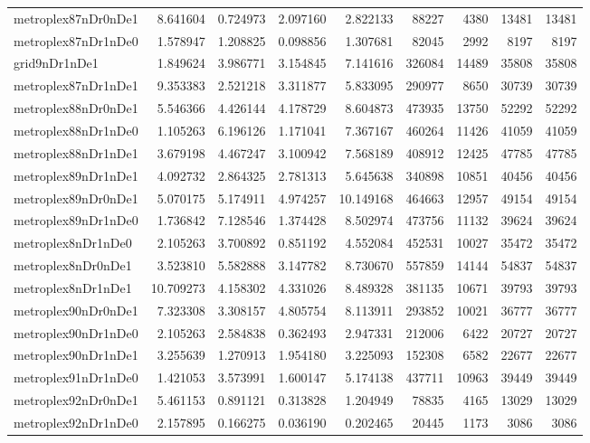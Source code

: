 \begin{longtable}{|l|r|r|r|r|r|r|r|r|}
metroplex87nDr0nDe1 & 8.641604 & 0.724973 & 2.097160 & 2.822133 & 88227 & 4380 & 13481 & 13481 \\
metroplex87nDr1nDe0 & 1.578947 & 1.208825 & 0.098856 & 1.307681 & 82045 & 2992 & 8197 & 8197 \\
grid9nDr1nDe1 & 1.849624 & 3.986771 & 3.154845 & 7.141616 & 326084 & 14489 & 35808 & 35808 \\
metroplex87nDr1nDe1 & 9.353383 & 2.521218 & 3.311877 & 5.833095 & 290977 & 8650 & 30739 & 30739 \\
metroplex88nDr0nDe1 & 5.546366 & 4.426144 & 4.178729 & 8.604873 & 473935 & 13750 & 52292 & 52292 \\
metroplex88nDr1nDe0 & 1.105263 & 6.196126 & 1.171041 & 7.367167 & 460264 & 11426 & 41059 & 41059 \\
metroplex88nDr1nDe1 & 3.679198 & 4.467247 & 3.100942 & 7.568189 & 408912 & 12425 & 47785 & 47785 \\
metroplex89nDr1nDe1 & 4.092732 & 2.864325 & 2.781313 & 5.645638 & 340898 & 10851 & 40456 & 40456 \\
metroplex89nDr0nDe1 & 5.070175 & 5.174911 & 4.974257 & 10.149168 & 464663 & 12957 & 49154 & 49154 \\
metroplex89nDr1nDe0 & 1.736842 & 7.128546 & 1.374428 & 8.502974 & 473756 & 11132 & 39624 & 39624 \\
metroplex8nDr1nDe0 & 2.105263 & 3.700892 & 0.851192 & 4.552084 & 452531 & 10027 & 35472 & 35472 \\
metroplex8nDr0nDe1 & 3.523810 & 5.582888 & 3.147782 & 8.730670 & 557859 & 14144 & 54837 & 54837 \\
metroplex8nDr1nDe1 & 10.709273 & 4.158302 & 4.331026 & 8.489328 & 381135 & 10671 & 39793 & 39793 \\
metroplex90nDr0nDe1 & 7.323308 & 3.308157 & 4.805754 & 8.113911 & 293852 & 10021 & 36777 & 36777 \\
metroplex90nDr1nDe0 & 2.105263 & 2.584838 & 0.362493 & 2.947331 & 212006 & 6422 & 20727 & 20727 \\
metroplex90nDr1nDe1 & 3.255639 & 1.270913 & 1.954180 & 3.225093 & 152308 & 6582 & 22677 & 22677 \\
metroplex91nDr1nDe0 & 1.421053 & 3.573991 & 1.600147 & 5.174138 & 437711 & 10963 & 39449 & 39449 \\
metroplex92nDr0nDe1 & 5.461153 & 0.891121 & 0.313828 & 1.204949 & 78835 & 4165 & 13029 & 13029 \\
metroplex92nDr1nDe0 & 2.157895 & 0.166275 & 0.036190 & 0.202465 & 20445 & 1173 & 3086 & 3086 \\

\end{longtable}
